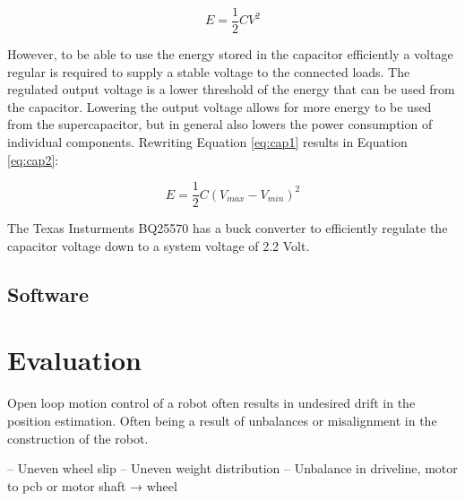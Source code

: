 \documentclass[letterpaper, 10 pt, conference]{ieeeconf}  %
\begin{document}
\begin{equation}
\label{eq:cap1}
E = \frac{1}{2}CV^{2}
\end{equation}

However, to be able to use the energy stored in the capacitor efficiently a voltage regular is required to supply a stable voltage to the connected loads.
The regulated output voltage is a lower threshold of the energy that can be used from the capacitor.
Lowering the output voltage allows for more energy to be used from the supercapacitor, but in general also lowers the power consumption of individual components. Rewriting Equation \ref{eq:cap1} results in Equation \ref{eq:cap2}:

\begin{equation}
\label{eq:cap2}
E = \frac{1}{2}C(V_{max} - V_{min})^{2}
\end{equation}

The Texas Insturments BQ25570 has a buck converter to efficiently regulate the capacitor voltage down to a system voltage of 2.2 Volt.


\subsection{Software}




\section{Evaluation} 

Open loop motion control of a robot often results in undesired drift in the position estimation.
Often being a result of unbalances or misalignment in the construction of the robot.

– Uneven wheel slip
– Uneven weight distribution
– Unbalance in driveline, motor to pcb or motor shaft → wheel
\end{document}
